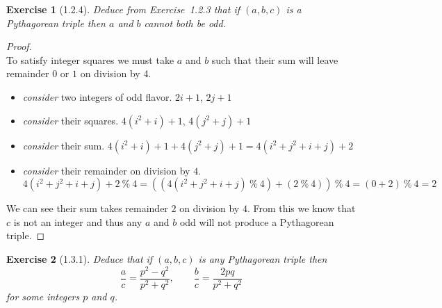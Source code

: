 \documentclass[10pt]{article}
\theoremstyle{plain}
\newtheorem{ex}{Exercise}
\begin{document}
\hrulefill

\begin{ex} [1.2.4]
  Deduce from Exercise~1.2.3 that if $(a,b,c)$ is a Pythagorean triple then $a$ and $b$ cannot both be odd.
\end{ex}

\begin{proof}
  \ \\
  To satisfy integer squares we must take $a$ and $b$ such that their sum will leave remainder $0$ or $1$ on division by 4.
  \begin{itemize}
    \item \textit{consider} two integers of odd flavor.
    \subitem  $2i+1$, $2j+1$
    \item \textit{consider} their squares.
    \subitem  $4(i^{2}+i)+1$, $4(j^{2}+j)+1$
    \item \textit{consider} their sum.
    \subitem  $4(i^{2}+i)+1+4(j^{2}+j)+1 = 4(i^{2}+j^{2}+i+j)+2$
    \item \textit{consider} their remainder on division by $4$.
    \subitem $4(i^{2}+j^{2}+i+j)+2 \ \% \ 4 = ((4(i^{2}+j^{2}+i+j) \ \% \ 4) + (2 \ \% \ 4)) \ \% \ 4 = (0+2) \ \% \ 4 = 2$
  \end{itemize}
  We can see their sum takes remainder $2$ on division by $4$. From this we know that $c$ is not an integer and thus any $a$ and $b$ odd will not produce a Pythagorean triple.
\end{proof}

\hrulefill

\begin{ex} [1.3.1]
  Deduce that if $(a,b,c)$ is any Pythagorean triple then
  \[
    \frac{a}{c}=\frac{p^2-q^2}{p^2+q^2},\qquad\frac{b}{c}=\frac{2pq}{p^2+q^2}
  \]
  for some integers $p$ and $q$.
\end{ex}
\end{document}
